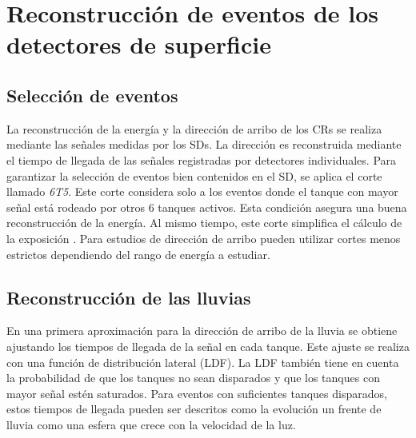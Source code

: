 \section{Reconstrucción de eventos de los detectores  de superficie}

\subsection{Selección de eventos}

La reconstrucción de la energía y la dirección de arribo de los CRs se realiza mediante las señales medidas por los SDs. La dirección es reconstruida mediante  el tiempo de llegada de las señales registradas por detectores individuales. Para garantizar la selección de eventos bien contenidos en el SD, se aplica el corte llamado \emph{6T5}. Este corte considera solo a los eventos donde el tanque con mayor señal está rodeado por otros 6 tanques activos. Esta condición asegura una buena reconstrucción de la energía. Al mismo tiempo, este corte simplifica el cálculo de la exposición \cite{exposure}. Para estudios de dirección de arribo pueden utilizar cortes menos estrictos dependiendo del rango de energía a estudiar.

\subsection{Reconstrucción de las lluvias}

En una primera aproximación para la dirección de arribo de la lluvia se obtiene ajustando los tiempos de llegada de la señal en cada tanque. Este ajuste se realiza con una función de distribución lateral (LDF). La LDF también tiene en cuenta la probabilidad de que los tanques no sean disparados y que los tanques con mayor señal estén saturados. Para eventos con suficientes tanques disparados, estos tiempos de llegada pueden ser descritos como la evolución un frente de lluvia como una esfera que crece con la velocidad de la luz.  

